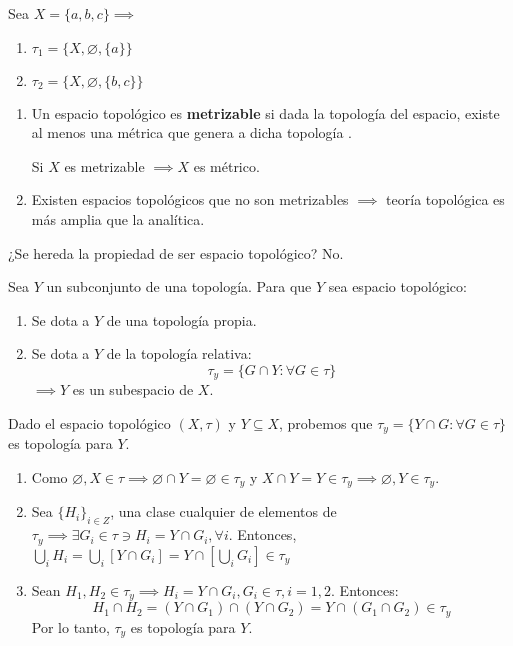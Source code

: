 \begin{ejemplo}
    Sea $X=\{a,b,c\}\implies $
    \begin{enumerate}
        \item $\tau_1=\{X,\varnothing,\{a\}\}$
        \item $\tau_2=\{X,\varnothing, \{b,c\}\}$
    \end{enumerate}
\end{ejemplo}

\begin{nota}
    \begin{enumerate}
        \item Un espacio topológico es \textbf{metrizable} si dada la topología del espacio, existe al menos una métrica que genera a dicha topología .
        \begin{prop}
            Si $X$ es metrizable $\implies X$ es métrico. 
        \end{prop}
        \item Existen espacios topológicos que no son metrizables $\implies$ teoría topológica es más amplia que la analítica. 
    \end{enumerate}
\end{nota}

\begin{nota}
    ¿Se hereda la propiedad de ser espacio topológico? No. 
\end{nota}

\begin{ejemplo}
    Sea $Y$ un subconjunto de una topología. Para que $Y$ sea espacio topológico:
    \begin{enumerate}
        \item Se dota a $Y$ de una topología propia. 
        \item Se dota a $Y$ de la topología relativa: 
        $$\tau_y =\{G\cap Y:\forall G\in \tau\}$$
        $\implies Y$ es un subespacio de $X$. 
    \end{enumerate}
\end{ejemplo}

\begin{nota}
    Dado el espacio topológico $(X,\tau)$ y $Y\subseteq X$, probemos que $\tau_y=\{Y\cap G:\forall G\in\tau\}$ es topología para $Y$. 
    \begin{enumerate}
        \item Como $\varnothing, X\in \tau \implies \varnothing \cap Y = \varnothing\in\tau_y$ y $X\cap Y=Y\in \tau_y\implies \varnothing,Y\in\tau_y$.
        \item Sea $\{H_i\}_{i\in Z}$, una clase cualquier de elementos de $\tau_y\implies \exists G_i\in\tau \ni H_i=Y\cap G_i,\forall i$. Entonces, $\bigcup_i H_i=\bigcup_i\left[Y\cap G_i\right]= Y\cap [\bigcup_i G_i]\in \tau_y$
        \item Sean $H_1,H_2\in\tau_y\implies H_i=Y\cap G_i,G_i\in \tau,i=1,2$. Entonces: 
            $$H_1\cap H_2=(Y\cap G_1)\cap (Y\cap G_2)=Y\cap (G_1\cap G_2)\in\tau_y$$
        Por lo tanto, $\tau_y$ es topología para $Y$. 
    \end{enumerate}
\end{nota}

